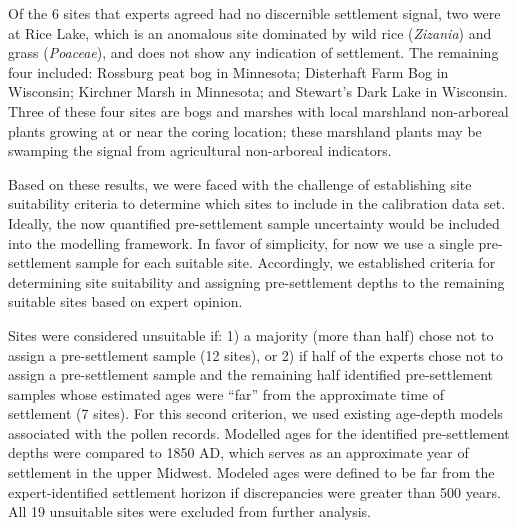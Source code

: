 \documentclass[12pt]{article}
\begin{document}
Of the 6 sites that experts agreed had no discernible settlement
signal, two were at Rice Lake, which is an anomalous site dominated by
wild rice (\textit{Zizania}) and grass (\textit{Poaceae}), and does
not show any indication of settlement. The remaining four included:
Rossburg peat bog in Minnesota; Disterhaft Farm Bog in Wisconsin;
Kirchner Marsh in Minnesota; and Stewart’s Dark Lake in
Wisconsin. Three of these four sites are bogs and marshes with local
marshland non-arboreal plants growing at or near the coring location;
these marshland plants may be swamping the signal from agricultural
non-arboreal indicators.

Based on these results, we were faced with the challenge of
establishing site suitability criteria to determine which sites to
include in the calibration data set. Ideally, the now quantified
pre-settlement sample uncertainty would be included into the modelling
framework. In favor of simplicity, for now we use a single
pre-settlement sample for each suitable site. Accordingly, we
established criteria for determining site suitability and assigning
pre-settlement depths to the remaining suitable sites based on expert
opinion.



Sites were considered unsuitable if: 1) a majority (more than half)
chose not to assign a pre-settlement sample (12 sites), or 2) if half
of the experts chose not to assign a pre-settlement sample and the
remaining half identified pre-settlement samples whose estimated ages
were “far” from the approximate time of settlement (7 sites). For this
second criterion, we used existing age-depth models associated with
the pollen records. Modelled ages for the identified pre-settlement
depths were compared to 1850 AD, which serves as an approximate year
of settlement in the upper Midwest.  Modeled ages were defined to be
far from the expert-identified settlement horizon if discrepancies
were greater than 500 years. All 19 unsuitable sites were excluded
from further analysis.
\end{document}
